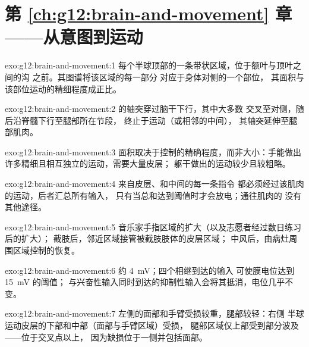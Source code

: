 \section*{第 \ref{ch:g12:brain-and-movement} 章——从意图到运动}

\begin{solution}{exo:g12:brain-and-movement:1}
每个半球顶部的一条带状区域，位于额叶与顶叶之间的沟
之前。其图谱将该区域的每一部分
对应于身体对侧的一个部位，
其面积与该部位运动的精细程度成正比。
\end{solution}

\begin{solution}{exo:g12:brain-and-movement:2}
的轴突穿过脑干下行，其中大多数
交叉至对侧，随后沿脊髓下行至腿部所在节段，
终止于运动（或相邻的中间），
其轴突延伸至腿部肌肉。
\end{solution}

\begin{solution}{exo:g12:brain-and-movement:3}
面积取决于控制的精确程度，而非大小：手能做出
许多精细且相互独立的运动，需要大量皮层；
躯干做出的运动较少且较粗略。
\end{solution}

\begin{solution}{exo:g12:brain-and-movement:4}
来自皮层、和中间的每一条指令
都必须经过该肌肉的运动，后者汇总所有输入，
只有当总和达到阈值时才会放电；通往肌肉的
没有其他途径。
\end{solution}

\begin{solution}{exo:g12:brain-and-movement:5}
音乐家手指区域的扩大（以及志愿者经过数日练习后的扩大）；
截肢后，邻近区域接管被截肢肢体的皮层区域；
中风后，由病灶周围区域控制的恢复。
\end{solution}

\begin{solution}{exo:g12:brain-and-movement:6}
约 \qty{4}{mV}；四个相继到达的输入
可使膜电位达到 \qty{15}{mV} 的阈值；
与兴奋性输入同时到达的抑制性输入会将其抵消，电位几乎不变。
\end{solution}

\begin{solution}{exo:g12:brain-and-movement:7}
左侧的面部和手臂受损较重，腿部较轻：右侧
半球运动皮层的下部和中部（面部与手臂区域）受损，
腿部区域仅上部受到部分波及——位于交叉点以上，
因为缺损位于一侧并包括面部。
\end{solution}

